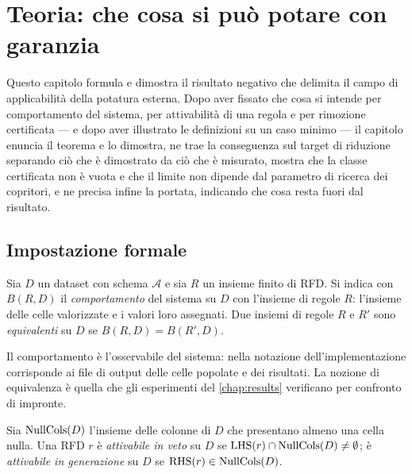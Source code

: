 \chapter{Teoria: che cosa si può potare con garanzia}\label{chap:theory}


\noindent Questo capitolo formula e dimostra il risultato negativo che delimita il campo di
applicabilità della potatura esterna. Dopo aver fissato che cosa si intende per comportamento del
sistema, per attivabilità di una regola e per rimozione certificata --- e dopo aver illustrato le
definizioni su un caso minimo --- il capitolo enuncia il teorema e lo dimostra, ne trae la
conseguenza sul target di riduzione separando ciò che è dimostrato da ciò che è misurato, mostra
che la classe certificata non è vuota e che il limite non dipende dal parametro di ricerca dei
copritori, e ne precisa infine la portata, indicando che cosa resta fuori dal risultato.

\section{Impostazione formale}\label{sec:theory-setup}

\begin{definition}\label{def:behaviour}
Sia $D$ un dataset con schema $\mathcal{A}$ e sia $R$ un insieme finito di RFD. Si indica con
$B(R, D)$ il \emph{comportamento} del sistema su $D$ con l'insieme di regole $R$: l'insieme delle
celle valorizzate e i valori loro assegnati. Due insiemi di regole $R$ e $R'$ sono
\emph{equivalenti} su $D$ se $B(R, D) = B(R', D)$.
\end{definition}

Il comportamento è l'osservabile del sistema: nella notazione dell'implementazione corrisponde ai
file di output delle celle popolate e dei risultati. La nozione di equivalenza è quella che gli
esperimenti del \autoref{chap:results} verificano per confronto di impronte.

\begin{definition}\label{def:activability}
Sia $\mathrm{NullCols}(D)$ l'insieme delle colonne di $D$ che presentano almeno una cella nulla. Una RFD
$r$ è \emph{attivabile in veto} su $D$ se $\mathrm{LHS}(r) \cap \mathrm{NullCols}(D) \neq \emptyset$; è
\emph{attivabile in generazione} su $D$ se $\mathrm{RHS}(r) \in \mathrm{NullCols}(D)$.
\end{definition}

